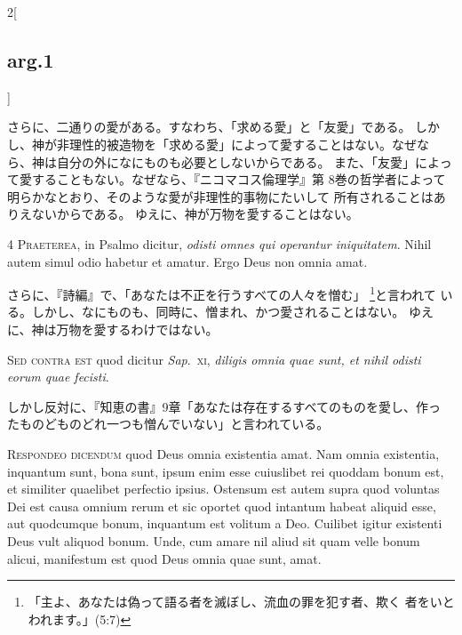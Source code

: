 \documentclass[paper=a4paper,fontsize=10pt,jafontsize=9pt,titlepage]{jlreq}
\begin{document}
\begin{paracol}{2}[\subsection{arg.1}]
\switchcolumn

さらに、二通りの愛がある。すなわち、「求める愛」と「友愛」である。
しかし、神が非理性的被造物を「求める愛」によって愛することはない。なぜな
 ら、神は自分の外になにものも必要としないからである。
また、「友愛」によって愛することもない。なぜなら、『ニコマコス倫理学』第
 8巻の哲学者によって明らかなとおり、そのような愛が非理性的事物にたいして
 所有されることはありえないからである。
ゆえに、神が万物を愛することはない。



{\scshape 4 Praeterea}, in Psalmo dicitur, {\itshape odisti omnes
qui operantur iniquitatem}. Nihil autem simul odio habetur et
amatur. Ergo Deus non omnia amat.

\switchcolumn

さらに、『詩編』で、「あなたは不正を行うすべての人々を憎む」
 \footnote{「主よ、あなたは偽って語る者を滅ぼし、流血の罪を犯す者、欺く
 者をいとわれます。」(5:7)}と言われて
 いる。しかし、なにものも、同時に、憎まれ、かつ愛されることはない。
ゆえに、神は万物を愛するわけではない。

\switchcolumn*[\subsection{s.c.}]


{\scshape Sed contra est} quod dicitur {\itshape Sap}.~{\scshape xi}, {\itshape diligis
omnia quae sunt, et nihil odisti eorum quae fecisti}.

\switchcolumn

しかし反対に、『知恵の書』9章「あなたは存在するすべてのものを愛し、作っ
 たものどものどれ一つも憎んでいない」と言われている。



{\scshape Respondeo dicendum} quod Deus omnia existentia
amat. Nam omnia existentia, inquantum sunt, bona sunt, ipsum enim esse
cuiuslibet rei quoddam bonum est, et similiter quaelibet perfectio
ipsius. Ostensum est autem supra quod voluntas Dei est causa omnium
rerum et sic oportet quod intantum habeat aliquid esse, aut quodcumque
bonum, inquantum est volitum a Deo. Cuilibet igitur existenti Deus vult
aliquod bonum. Unde, cum amare nil aliud sit quam velle bonum alicui,
manifestum est quod Deus omnia quae sunt, amat.


\end{paracol}
\end{document}
